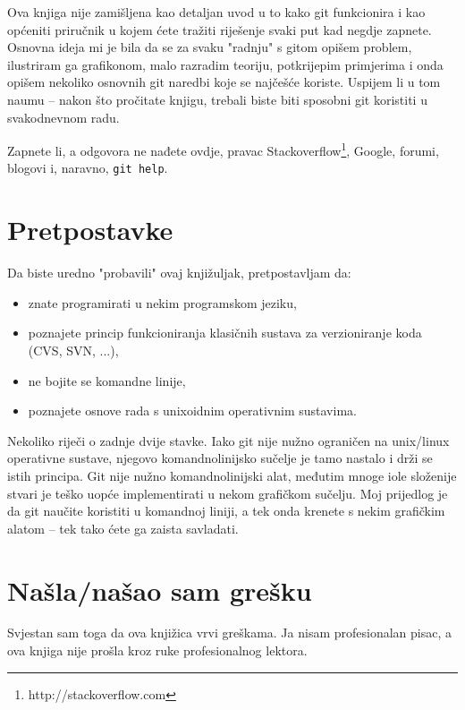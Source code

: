 Ova knjiga nije zamišljena kao detaljan uvod u to kako git funkcionira i kao općeniti priručnik u kojem ćete tražiti riješenje svaki put kad negdje zapnete.
Osnovna ideja mi je bila da se za svaku "radnju" s gitom opišem problem, ilustriram ga grafikonom, malo razradim teoriju, potkrijepim primjerima i onda opišem nekoliko osnovnih git naredbi koje se najčešće koriste.
Uspijem li u tom naumu -- nakon što pročitate knjigu, trebali biste biti sposobni git koristiti u svakodnevnom radu. 

Zapnete li, a odgovora ne nađete ovdje, pravac Stackoverflow\footnote{http://stackoverflow.com}, Google, 
forumi, blogovi i, naravno, \verb+git help+.

\section*{Pretpostavke}

Da biste uredno "probavili" ovaj knjižuljak, pretpostavljam da:

\begin{itemize}
	\item znate programirati u nekim programskom jeziku,
	\item poznajete princip funkcioniranja klasičnih sustava za verzioniranje koda (CVS, SVN, ...),
	\item ne bojite se komandne linije,
	\item poznajete osnove rada s unixoidnim operativnim sustavima.
\end{itemize}

Nekoliko riječi o zadnje dvije stavke.
Iako git nije nužno ograničen na unix/linux operativne sustave, njegovo komandnolinijsko sučelje je tamo nastalo i drži se istih principa.
Git nije nužno komandnolinijski alat, međutim mnoge iole složenije stvari je teško uopće implementirati u nekom grafičkom sučelju. 
Moj prijedlog je da git naučite koristiti u komandnoj liniji, a tek onda krenete s nekim grafičkim alatom -- tek tako ćete ga zaista savladati.

\section*{Našla/našao sam grešku}

Svjestan sam toga da ova knjižica vrvi greškama.
Ja nisam profesionalan pisac, a ova knjiga nije prošla kroz ruke profesionalnog lektora.

